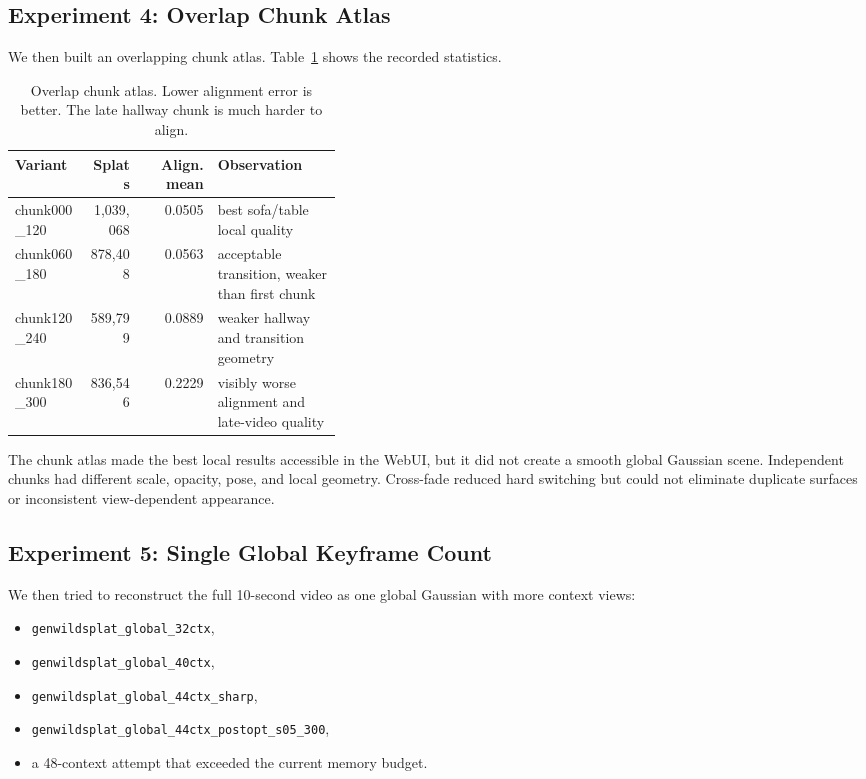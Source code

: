 \documentclass[11pt]{article}
\newcommand{\code}[1]{\texttt{#1}}
\begin{document}
\subsection{Experiment 4: Overlap Chunk Atlas}

We then built an overlapping chunk atlas. Table~\ref{tab:chunks} shows the recorded statistics.

\begin{table}[H]
\centering
\caption{Overlap chunk atlas. Lower alignment error is better. The late hallway chunk is much harder to align.}
\label{tab:chunks}
\begin{tabular}{@{}lrrp{0.38\linewidth}@{}}
\toprule
\textbf{Variant} & \textbf{Splats} & \textbf{Align. mean} & \textbf{Observation} \\
\midrule
chunk000\_120 & 1,039,068 & 0.0505 & best sofa/table local quality \\
chunk060\_180 & 878,408 & 0.0563 & acceptable transition, weaker than first chunk \\
chunk120\_240 & 589,799 & 0.0889 & weaker hallway and transition geometry \\
chunk180\_300 & 836,546 & 0.2229 & visibly worse alignment and late-video quality \\
\bottomrule
\end{tabular}
\end{table}

The chunk atlas made the best local results accessible in the WebUI, but it did not create a smooth global Gaussian scene. Independent chunks had different scale, opacity, pose, and local geometry. Cross-fade reduced hard switching but could not eliminate duplicate surfaces or inconsistent view-dependent appearance.

\subsection{Experiment 5: Single Global Keyframe Count}

We then tried to reconstruct the full 10-second video as one global Gaussian with more context views:

\begin{itemize}
    \item \code{genwildsplat\_global\_32ctx},
    \item \code{genwildsplat\_global\_40ctx},
    \item \code{genwildsplat\_global\_44ctx\_sharp},
    \item \code{genwildsplat\_global\_44ctx\_postopt\_s05\_300},
    \item a 48-context attempt that exceeded the current memory budget.
\end{itemize}
\end{document}
